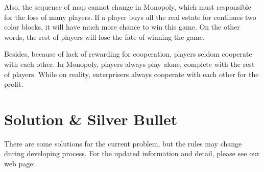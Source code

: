 \documentclass[a4paper,12pt]{article}
\begin{document}
	Also, the sequence of map cannot change in Monopoly, which must responsible for the loss of many players. If a player buys all the real estate for continues two color blocks, it will have much more chance to win this game. On the other words, the rest of players will lose the fate of winning the game.
	
	Besides, because of lack of rewarding for cooperation, players seldom cooperate with each other. In Monopoly, players always play alone, complete with the rest of players. While on reality, enterprisers always cooperate with each other for the profit.
\section{Solution \& Silver Bullet}
\lettrine[lines=2,loversize=0.35,lraise=0.07,findent=3pt,nindent=2pt]{T}{}here are some solutions for the current problem, but the rules may change during developing process. For the updated information and detail, please see our web page: \href{https://epicmonopoly.github.io}{\color{blue}{EpicMonopoly}}
\end{document}
